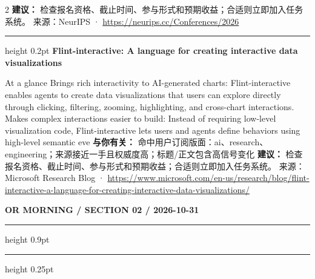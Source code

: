 \documentclass[10.5pt]{ctexart}
\begin{document}
\begin{multicols}{2}
\textbf{建议：} 检查报名资格、截止时间、参与形式和预期收益；合适则立即加入任务系统。
{\footnotesize\color{ormuted} 来源：NeurIPS · \url{https://neurips.cc/Conferences/2026}}
\vspace{2mm}
\hrule height 0.2pt
\vspace{2mm}
{\large\bfseries Flint-interactive: A language for creating interactive data visualizations}\par
At a glance Brings rich interactivity to AI-generated charts: Flint-interactive enables agents to create data visualizations that users can explore directly through clicking, filtering, zooming, highlighting, and cross-chart interactions. Makes complex interactions easier to build: Instead of requiring low-level visualization code, Flint-interactive lets users and agents define behaviors using high-level semantic eve
\textbf{与你有关：} 命中用户订阅版面：ai、research、engineering；来源接近一手且权威度高；标题/正文包含高信号变化
\textbf{建议：} 检查报名资格、截止时间、参与形式和预期收益；合适则立即加入任务系统。
{\footnotesize\color{ormuted} 来源：Microsoft Research Blog · \url{https://www.microsoft.com/en-us/research/blog/flint-interactive-a-language-for-creating-interactive-data-visualizations/}}
\end{multicols}
\newpage
{\small\bfseries OR MORNING / SECTION 02 / 2026-10-31}
\vspace{2mm}
\hrule height 0.9pt
\vspace{1.5mm}
\hrule height 0.25pt
\vspace{4mm}
\end{document}

